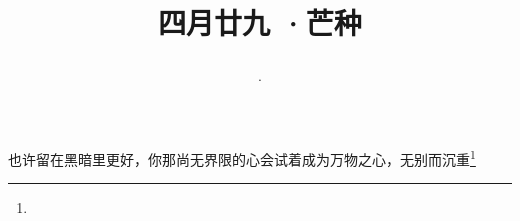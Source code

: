 \title{\date[d=5,m=6,y=2024][year:cn-y,年,month:cn,day:cn,日,·,weekday]·四月廿九 ·芒种}
也许留在黑暗里更好，你那尚无界限的心会试着成为万物之心，无别而沉重\footnote{ }

